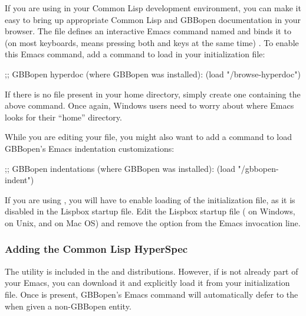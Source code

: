 \documentclass[10pt,twoside,english,pdftex]{article}
\begin{document}
%
If you are using
 in your Common
Lisp development environment, you can make it easy to bring up appropriate
Common Lisp and GBBopen documentation in your browser.  The file
 defines an interactive
Emacs command named  and binds it to
 (on most keyboards,  means pressing
both  and  keys at the same time) .  To enable this Emacs
command, add a command to load
 in your 
initialization file:
%
\W\supp
\begin{example}
  ;; GBBopen hyperdoc (where GBBopen was installed):
  (load "/browse-hyperdoc")
\end{example}

If there is no  file present in your home directory, simply
create one containing the above command. Once again, Windows users need to
worry about where Emacs looks for their ``home'' directory.

While you are editing your  file, you might also want to add a
command to load GBBopen's Emacs indentation customizations:
%
\W\supp
\begin{example}
  ;; GBBopen indentations (where GBBopen was installed):
  (load "/gbbopen-indent")
\end{example}

If you are using
, you
will have to enable loading of the  initialization file, as it is
disabled in the Lispbox startup file.  Edit the Lispbox startup file
( on Windows,  on Unix, and
 on Mac
OS) and remove the  option from the Emacs
invocation line.

\subsubsection*{Adding the Common Lisp HyperSpec}

The
utility is included in the
 and
 distributions.
However, if  is not already part of your Emacs, you
can download it and explicitly load it from your  initialization
file.  Once  is present, GBBopen's
 Emacs command will automatically defer to the
 when given a
non-GBBopen entity.
\end{document}
